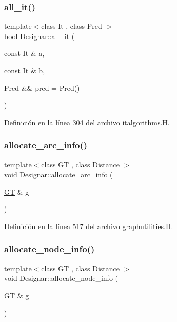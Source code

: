 \subsubsection{\texorpdfstring{all\+\_\+it()}{all\_it()}\hspace{0.1cm}{\footnotesize\ttfamily [2/2]}}
{\footnotesize\ttfamily template$<$class It , class Pred $>$ \\
bool Designar\+::all\+\_\+it (\begin{DoxyParamCaption}\item[{const It \&}]{a,  }\item[{const It \&}]{b,  }\item[{Pred \&\&}]{pred = {\ttfamily Pred()} }\end{DoxyParamCaption})}



Definición en la línea 304 del archivo italgorithms.\+H.

\mbox{\label{namespace_designar_af0adaa2c965433759560c2894198f572}} 
\subsubsection{\texorpdfstring{allocate\+\_\+arc\+\_\+info()}{allocate\_arc\_info()}}
{\footnotesize\ttfamily template$<$class GT , class Distance $>$ \\
void Designar\+::allocate\+\_\+arc\+\_\+info (\begin{DoxyParamCaption}\item[{\hyperlink{demo-buildgraph_8_c_a3001c40d2c31ca87ed96cd7d1334a55e}{GT} \&}]{g }\end{DoxyParamCaption})\hspace{0.3cm}{\ttfamily [inline]}}



Definición en la línea 517 del archivo graphutilities.\+H.

\mbox{\label{namespace_designar_aa44e92d6dbbdb33757bfacb5995bbdb3}} 
\subsubsection{\texorpdfstring{allocate\+\_\+node\+\_\+info()}{allocate\_node\_info()}}
{\footnotesize\ttfamily template$<$class GT , class Distance $>$ \\
void Designar\+::allocate\+\_\+node\+\_\+info (\begin{DoxyParamCaption}\item[{\hyperlink{demo-buildgraph_8_c_a3001c40d2c31ca87ed96cd7d1334a55e}{GT} \&}]{g }\end{DoxyParamCaption})\hspace{0.3cm}{\ttfamily [inline]}}



